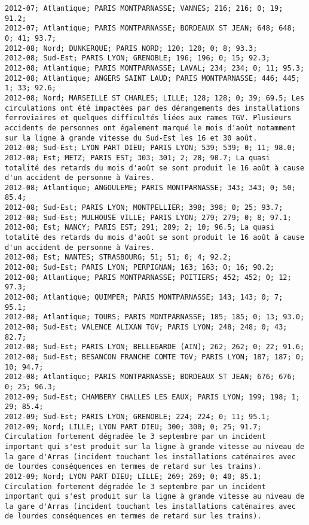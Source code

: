 \documentclass{article}
\begin{document}
\begin{Verbatim}[commandchars=\\\{\}]
2012-07; Atlantique; PARIS MONTPARNASSE; VANNES; 216; 216; 0; 19; 91.2; 
2012-07; Atlantique; PARIS MONTPARNASSE; BORDEAUX ST JEAN; 648; 648; 0; 41; 93.7; 
2012-08; Nord; DUNKERQUE; PARIS NORD; 120; 120; 0; 8; 93.3; 
2012-08; Sud-Est; PARIS LYON; GRENOBLE; 196; 196; 0; 15; 92.3; 
2012-08; Atlantique; PARIS MONTPARNASSE; LAVAL; 234; 234; 0; 11; 95.3; 
2012-08; Atlantique; ANGERS SAINT LAUD; PARIS MONTPARNASSE; 446; 445; 1; 33; 92.6; 
2012-08; Nord; MARSEILLE ST CHARLES; LILLE; 128; 128; 0; 39; 69.5; Les circulations ont été impactées par des dérangements des installations ferroviaires et quelques difficultés liées aux rames TGV. Plusieurs accidents de personnes ont également marqué le mois d'août notamment sur la ligne à grande vitesse du Sud-Est les 16 et 30 août.
2012-08; Sud-Est; LYON PART DIEU; PARIS LYON; 539; 539; 0; 11; 98.0; 
2012-08; Est; METZ; PARIS EST; 303; 301; 2; 28; 90.7; La quasi totalité des retards du mois d'août se sont produit le 16 août à cause d'un accident de personne à Vaires.
2012-08; Atlantique; ANGOULEME; PARIS MONTPARNASSE; 343; 343; 0; 50; 85.4; 
2012-08; Sud-Est; PARIS LYON; MONTPELLIER; 398; 398; 0; 25; 93.7; 
2012-08; Sud-Est; MULHOUSE VILLE; PARIS LYON; 279; 279; 0; 8; 97.1; 
2012-08; Est; NANCY; PARIS EST; 291; 289; 2; 10; 96.5; La quasi totalité des retards du mois d'août se sont produit le 16 août à cause d'un accident de personne à Vaires.
2012-08; Est; NANTES; STRASBOURG; 51; 51; 0; 4; 92.2; 
2012-08; Sud-Est; PARIS LYON; PERPIGNAN; 163; 163; 0; 16; 90.2; 
2012-08; Atlantique; PARIS MONTPARNASSE; POITIERS; 452; 452; 0; 12; 97.3; 
2012-08; Atlantique; QUIMPER; PARIS MONTPARNASSE; 143; 143; 0; 7; 95.1; 
2012-08; Atlantique; TOURS; PARIS MONTPARNASSE; 185; 185; 0; 13; 93.0; 
2012-08; Sud-Est; VALENCE ALIXAN TGV; PARIS LYON; 248; 248; 0; 43; 82.7; 
2012-08; Sud-Est; PARIS LYON; BELLEGARDE (AIN); 262; 262; 0; 22; 91.6; 
2012-08; Sud-Est; BESANCON FRANCHE COMTE TGV; PARIS LYON; 187; 187; 0; 10; 94.7; 
2012-08; Atlantique; PARIS MONTPARNASSE; BORDEAUX ST JEAN; 676; 676; 0; 25; 96.3; 
2012-09; Sud-Est; CHAMBERY CHALLES LES EAUX; PARIS LYON; 199; 198; 1; 29; 85.4; 
2012-09; Sud-Est; PARIS LYON; GRENOBLE; 224; 224; 0; 11; 95.1; 
2012-09; Nord; LILLE; LYON PART DIEU; 300; 300; 0; 25; 91.7; Circulation fortement dégradée le 3 septembre par un incident important qui s'est produit sur la ligne à grande vitesse au niveau de la gare d'Arras (incident touchant les installations caténaires avec de lourdes conséquences en termes de retard sur les trains).
2012-09; Nord; LYON PART DIEU; LILLE; 269; 269; 0; 40; 85.1; Circulation fortement dégradée le 3 septembre par un incident important qui s'est produit sur la ligne à grande vitesse au niveau de la gare d'Arras (incident touchant les installations caténaires avec de lourdes conséquences en termes de retard sur les trains).

\end{Verbatim}
\end{document}
